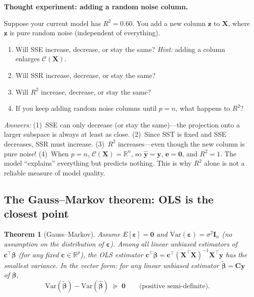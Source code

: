 \documentclass[11pt,a4paper]{article}
\theoremstyle{plain}
\newtheorem{theorem}{Theorem}[section]
\theoremstyle{definition}
\newcommand{\R}{\mathbb{R}}
\newcommand{\yhat}{\hat{\bm{y}}}
\newcommand{\bhat}{\hat{\bm{\beta}}}
\newcommand{\btilde}{\tilde{\bm{\beta}}}
\newcommand{\bX}{\bm{X}}
\newcommand{\by}{\bm{y}}
\newcommand{\be}{\bm{e}}
\newcommand{\bI}{\bm{I}}
\newcommand{\Col}{\mathcal{C}}
\begin{document}
\begin{stopandthink}
\textbf{Thought experiment: adding a random noise column.}

Suppose your current model has $R^2 = 0.60$.
You add a new column $\bm{z}$ to $\bX$, where $\bm{z}$ is pure random noise
(independent of everything).
\begin{enumerate}[nosep]
  \item Will SSE increase, decrease, or stay the same?
        \emph{Hint:} adding a column enlarges $\Col(\bX)$.
  \item Will SSR increase, decrease, or stay the same?
  \item Will $R^2$ increase, decrease, or stay the same?
  \item If you keep adding random noise columns until $p = n$,
        what happens to $R^2$?
\end{enumerate}
\emph{Answers:}
(1)~SSE can only decrease (or stay the same)---the projection onto a
larger subspace is always at least as close.
(2)~Since SST is fixed and SSE decreases, SSR must increase.
(3)~$R^2$ increases---even though the new column is pure noise!
(4)~When $p = n$, $\Col(\bX) = \R^n$, so $\yhat = \by$, $\be = \bm{0}$,
and $R^2 = 1$. The model ``explains'' everything but predicts nothing.
This is why $R^2$ alone is not a reliable measure of model quality.
\end{stopandthink}


\subsection{The Gauss--Markov theorem: OLS is the closest point}

\begin{theorem}[Gauss--Markov]\label{thm:gm}
Assume $E[\bm{\varepsilon}] = \bm{0}$ and
$\text{Var}(\bm{\varepsilon}) = \sigma^2\bI_n$
(no assumption on the distribution of $\bm{\varepsilon}$).
Among all linear unbiased estimators of $\bm{c}^\top\bm{\beta}$
(for any fixed $\bm{c}\in\R^p$), the OLS estimator
$\bm{c}^\top\bhat = \bm{c}^\top(\bX^\top\bX)^{-1}\bX^\top\by$
has the smallest variance.
In the vector form: for any linear unbiased estimator
$\btilde = \bm{C}\by$ of $\bm{\beta}$,
\[
  \text{Var}(\btilde) - \text{Var}(\bhat) \;\succeq\; \bm{0}
  \qquad\text{(positive semi-definite).}
\]
\end{theorem}
\end{document}
